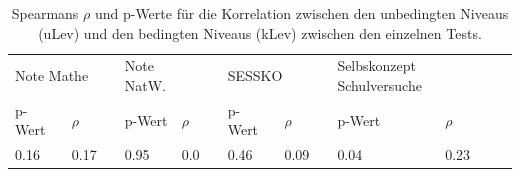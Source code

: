 \begin{table}[htbp]
  \centering
\begin{tabular}{@{}lllllllllll@{}}
\toprule
   \multicolumn{2}{l}{Note Mathe} &&  \multicolumn{2}{l}{Note NatW.}&&  \multicolumn{2}{l}{SESSKO}&&  \multicolumn{2}{l}{Selbskonzept Schulversuche}\\ 
      \cmidrule{1-2}\cmidrule{4-5}\cmidrule{7-8}\cmidrule{10-11}
   p-Wert & $\rho$ && p-Wert & $\rho$  && p-Wert & $\rho$&& p-Wert & $\rho$\\ 
\midrule
   0.16 & 0.17 && 0.95 & 0.0 && 0.46 & 0.09 && 0.04 & 0.23    \\ 

\bottomrule
\end{tabular} 
  \caption{Spearmans $\rho$ und p-Werte für die Korrelation zwischen den unbedingten Niveaus (uLev) und den bedingten Niveaus (kLev) zwischen den einzelnen Tests.  }
  \label{tab:CorNiveau}
\end{table}

